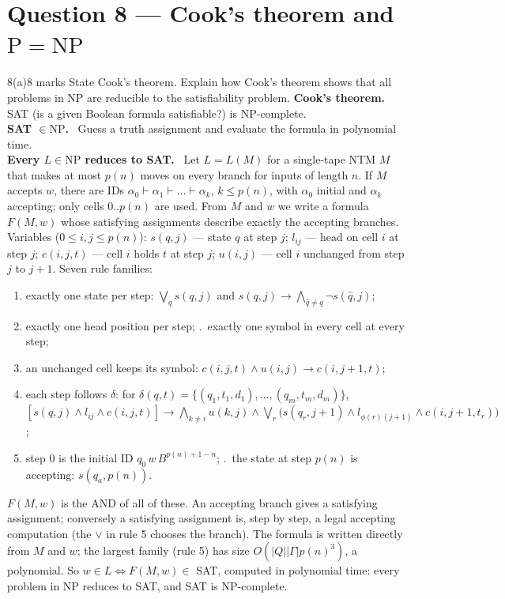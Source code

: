 \documentclass[10.5pt,a4paper]{article}
\newcommand{\ansh}[1]{\textbf{\color{exborder}#1}\ }
\newcommand{\NP}{\mathrm{NP}}
\renewcommand{\P}{\mathrm{P}}
\begin{document}
\section{Question 8 --- Cook's theorem and $\P=\NP$}
\begin{qa}{8(a)}{8 marks}
State Cook's theorem. Explain how Cook's theorem shows that all problems in NP are reducible to the satisfiability problem.
\tcblower
\ansh{Cook's theorem.} SAT (is a given Boolean formula satisfiable?) is NP-complete.\\
\ansh{SAT $\in\NP$.} Guess a truth assignment and evaluate the formula in polynomial time.\\
\ansh{Every $L\in\NP$ reduces to SAT.} Let $L=L(M)$ for a single-tape NTM $M$ that makes at most $p(n)$ moves on every branch for inputs of length
$n$. If $M$ accepts $w$, there are IDs $\alpha_0\vdash\alpha_1\vdash\dots\vdash\alpha_k$, $k\le p(n)$, with $\alpha_0$ initial and $\alpha_k$ accepting; only
cells $0..p(n)$ are used. From $M$ and $w$ we write a formula $F(M,w)$ whose satisfying assignments describe exactly the accepting branches.
Variables ($0\le i,j\le p(n)$): $s(q,j)$ --- state $q$ at step $j$; $l_{ij}$ --- head on cell $i$ at step $j$; $c(i,j,t)$ --- cell $i$ holds $t$ at step $j$;
$u(i,j)$ --- cell $i$ unchanged from step $j$ to $j+1$. Seven rule families:
\begin{enumerate}
\item exactly one state per step: $\bigvee_q s(q,j)$ and $s(q,j)\to\bigwedge_{\hat q\ne q}\neg s(\hat q,j)$;
\item exactly one head position per step; .\ exactly one symbol in every cell at every step;
\item[4.] an unchanged cell keeps its symbol: $c(i,j,t)\wedge u(i,j)\to c(i,j+1,t)$;
\item[5.] each step follows $\delta$: for $\delta(q,t)=\{(q_1,t_1,d_1),\dots,(q_m,t_m,d_m)\}$,
$[s(q,j)\wedge l_{ij}\wedge c(i,j,t)]\to\bigwedge_{k\ne i}u(k,j)\wedge\bigvee_r\big(s(q_r,j{+}1)\wedge l_{\phi(r)(j+1)}\wedge c(i,j{+}1,t_r)\big)$;
\item[6.] step 0 is the initial ID $q_0\,w\,B^{p(n)+1-n}$; .\ the state at step $p(n)$ is accepting: $s(q_a,p(n))$.
\end{enumerate}
$F(M,w)$ is the AND of all of these. An accepting branch gives a satisfying assignment; conversely a satisfying assignment is, step by step, a
legal accepting computation (the $\vee$ in rule 5 chooses the branch). The formula is written directly from $M$ and $w$; the largest family
(rule 5) has size $O(|Q||\Gamma|p(n)^3)$, a polynomial. So $w\in L\iff F(M,w)\in$ SAT, computed in polynomial time: every problem in NP
reduces to SAT, and SAT is NP-complete.
\end{qa}
\end{document}
